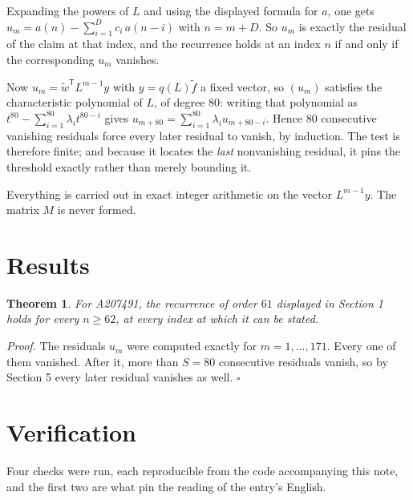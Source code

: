 \documentclass[11pt]{article}
\newtheorem{theorem}{Theorem}
\theoremstyle{definition}
\begin{document}
Expanding the powers of $L$ and using the displayed formula for $a$, one gets $u_m = a(n) - \sum_{i=1}^{D} c_i\,a(n-i)$ with $n = m + D$. So $u_m$ is exactly the residual of the claim at that index, and the recurrence holds at an index $n$ if and only if the corresponding $u_m$ vanishes.

Now $u_m = \tilde w^{\mathsf T} L^{m-1} y$ with $y = q(L)\tilde f$ a fixed vector, so $(u_m)$ satisfies the characteristic polynomial of $L$, of degree $80$: writing that polynomial as $t^{80} - \sum_{i=1}^{80} \lambda_i t^{80-i}$ gives $u_{m+80} = \sum_{i=1}^{80} \lambda_i u_{m+80-i}$. Hence $80$ consecutive vanishing residuals force every later residual to vanish, by induction. The test is therefore finite; and because it locates the {\itshape last} nonvanishing residual, it pins the threshold exactly rather than merely bounding it.

Everything is carried out in exact integer arithmetic on the vector $L^{m-1}y$. The matrix $M$ is never formed.

\section{Results}

\begin{theorem} For A207491, the recurrence of order $61$ displayed in Section 1 holds for every $n \ge 62$, at every index at which it can be stated.\end{theorem}

{\itshape Proof.} The residuals $u_m$ were computed exactly for $m = 1,\dots,171$. Every one of them vanished. After it, more than $S = 80$ consecutive residuals vanish, so by Section 5 every later residual vanishes as well. $\square$

\section{Verification}

Four checks were run, each reproducible from the code accompanying this note, and the first two are what pin the reading of the entry's English.
\end{document}
